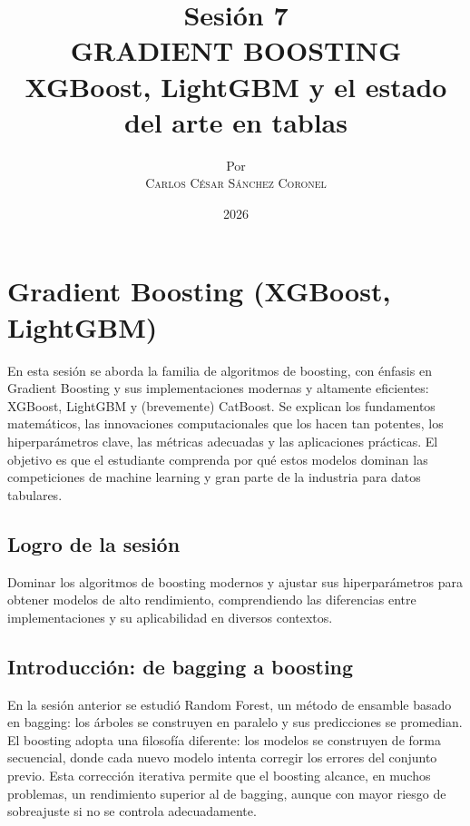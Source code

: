 \documentclass[12pt,a4paper,openany,oneside]{book}
\title{
    \textbf{Sesión 7} \\ 
    \Huge \textbf{GRADIENT BOOSTING} \\
    \Large XGBoost, LightGBM y el estado del arte en tablas
}
\author{
    \small Por \\ \vspace{0.2cm}
    \Large \textsc{Carlos César Sánchez Coronel}
}
\date{2026}
\begin{document}
\maketitle
\tableofcontents
{}

\chapter{Gradient Boosting (XGBoost, LightGBM)}

En esta sesión se aborda la familia de algoritmos de boosting, con énfasis en Gradient Boosting y sus implementaciones modernas y altamente eficientes: XGBoost, LightGBM y (brevemente) CatBoost. Se explican los fundamentos matemáticos, las innovaciones computacionales que los hacen tan potentes, los hiperparámetros clave, las métricas adecuadas y las aplicaciones prácticas. El objetivo es que el estudiante comprenda por qué estos modelos dominan las competiciones de machine learning y gran parte de la industria para datos tabulares.

\section{Logro de la sesión}
Dominar los algoritmos de boosting modernos y ajustar sus hiperparámetros para obtener modelos de alto rendimiento, comprendiendo las diferencias entre implementaciones y su aplicabilidad en diversos contextos.

\section{Introducción: de bagging a boosting}
En la sesión anterior se estudió Random Forest, un método de ensamble basado en bagging: los árboles se construyen en paralelo y sus predicciones se promedian. El boosting adopta una filosofía diferente: los modelos se construyen de forma secuencial, donde cada nuevo modelo intenta corregir los errores del conjunto previo. Esta corrección iterativa permite que el boosting alcance, en muchos problemas, un rendimiento superior al de bagging, aunque con mayor riesgo de sobreajuste si no se controla adecuadamente.
\end{document}
